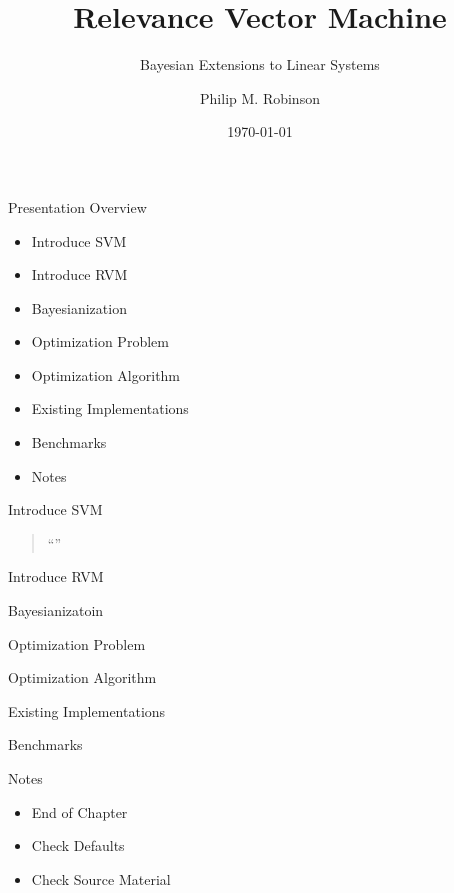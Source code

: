 \documentclass[11pt]{beamer}
\title{Relevance Vector Machine}
\subtitle{Bayesian Extensions to Linear Systems}
\author{Philip M. Robinson}
\date{\today}
\institute{Presented to \\ OHSU Machine Learning Class}
\begin{document}
\begin{frame}
  \titlepage
\end{frame}


\begin{frame}{Presentation Overview}
  \begin{itemize}
  \item Introduce SVM
  \item Introduce RVM
  \item Bayesianization
  \item Optimization Problem
  \item Optimization Algorithm
  \item Existing Implementations
  \item Benchmarks
  \item Notes
  \end{itemize}
\end{frame}

\begin{frame}{Introduce SVM}
  \begin{quote}
    ``''
  \end{quote}
\end{frame}

\begin{frame}{Introduce RVM}
\end{frame}

\begin{frame}{Bayesianizatoin}
\end{frame}

\begin{frame}{Optimization Problem}
\end{frame}

\begin{frame}{Optimization Algorithm}
\end{frame}

\begin{frame}{Existing Implementations}
\end{frame}

\begin{frame}{Benchmarks}
\end{frame}

\begin{frame}{Notes}
  \begin{itemize}
  \item End of Chapter
  \item Check Defaults
  \item Check Source Material
  \end{itemize}
\end{frame}

\begin{frame}{}
\end{frame}

\begin{frame}{}
\end{frame}
\end{document}
